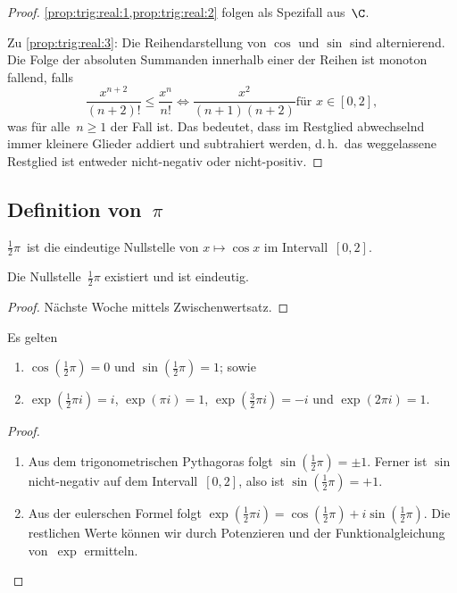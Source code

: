 \documentclass[a4paper]{article}
\begin{document}
\begin{proof}
    \cref{prop:trig:real:1,prop:trig:real:2} folgen als Spezifall aus~$\C$.

    Zu \cref{prop:trig:real:3}: Die Reihendarstellung von $\cos$ und $\sin$ sind alternierend. Die Folge der absoluten Summanden innerhalb einer der Reihen ist monoton fallend, falls
    \begin{equation*}
        \frac{x^{n+2}}{(n+2)!} \leq \frac{x^n}{n!} \iff \frac{x^2}{(n+1)(n+2)} \text{für } x \in [0, 2],
    \end{equation*}
    was für alle~$n \geq 1$ der Fall ist. Das bedeutet, dass im Restglied abwechselnd immer kleinere Glieder addiert und subtrahiert werden, d.\,h.\ das weggelassene Restglied ist entweder nicht-negativ oder nicht-positiv.
\end{proof}

\subsection{Definition von~\texorpdfstring{$\pi$}{Pi}}

\begin{definition}[Kreiszahl]
    $\frac{1}{2}\pi$~ist die eindeutige Nullstelle von $x \mapsto \cos x$ im Intervall~$[0, 2]$.
\end{definition}

\begin{proposition}
    Die Nullstelle~$\frac{1}{2}\pi$ existiert und ist eindeutig.
\end{proposition}

\begin{proof}
    Nächste Woche mittels Zwischenwertsatz.
\end{proof}

\begin{proposition}\label{prop:pi:functions}
    Es gelten
    \begin{enumerate}
        \item $\cos(\frac{1}{2}\pi) = 0$ und $\sin(\frac{1}{2}\pi) = 1$; sowie
        \item $\exp(\frac{1}{2}\pi i) = i$, $\exp(\pi i) = 1$, $\exp(\frac{3}{2}\pi i) = -i$ und $\exp(2\pi i) = 1$.
    \end{enumerate}
\end{proposition}

\begin{proof}\leavevmode
    \begin{enumerate}
        \item Aus dem trigonometrischen Pythagoras folgt $\sin(\frac{1}{2}\pi) = \pm 1$. Ferner ist $\sin$ nicht-negativ auf dem Intervall~$[0, 2]$, also ist $\sin(\frac{1}{2}\pi) = +1$.
        \item Aus der eulerschen Formel folgt $\exp(\frac{1}{2}\pi i) = \cos(\frac{1}{2}\pi) + i\sin(\frac{1}{2}\pi)$. Die restlichen Werte können wir durch Potenzieren und der Funktionalgleichung von~$\exp$ ermitteln.\qedhere
    \end{enumerate}
\end{proof}
\end{document}
